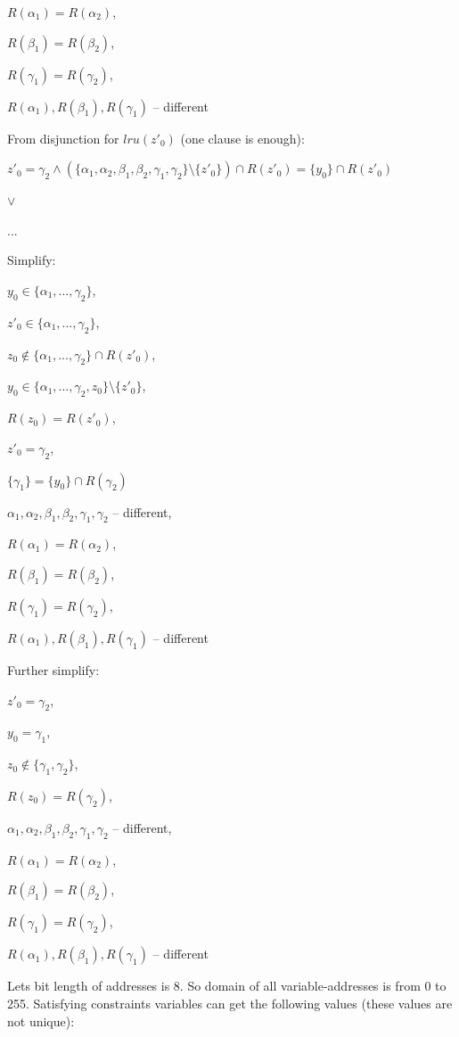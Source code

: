 $R(\alpha_1) = R(\alpha_2)$,

$R(\beta_1) = R(\beta_2)$,

$R(\gamma_1) = R(\gamma_2)$,

$R(\alpha_1), R(\beta_1), R(\gamma_1)$ -- different

From disjunction for $lru(z'_0)$ (one clause is enough):

$z'_0 = \gamma_2 \wedge (\{ \alpha_1, \alpha_2, \beta_1, \beta_2,
\gamma_1, \gamma_2 \}\setminus \{z'_0\}) \cap R(z'_0) = \{y_0\} \cap
R(z'_0)$

$\vee$

...

Simplify:

$y_0 \in \{ \alpha_1, ..., \gamma_2 \}$,

$z'_0 \in \{ \alpha_1, ..., \gamma_2 \}$,

$z_0 \notin \{ \alpha_1, ..., \gamma_2 \} \cap R(z'_0)$,

$y_0 \in \{ \alpha_1, ..., \gamma_2, z_0 \} \setminus \{z'_0 \}$,

$R(z_0) = R(z'_0)$,

$z'_0 = \gamma_2$,

$\{ \gamma_1 \} = \{ y_0 \} \cap R(\gamma_2)$

$\alpha_1, \alpha_2, \beta_1, \beta_2, \gamma_1, \gamma_2$ --
different,

$R(\alpha_1) = R(\alpha_2)$,

$R(\beta_1) = R(\beta_2)$,

$R(\gamma_1) = R(\gamma_2)$,

$R(\alpha_1), R(\beta_1), R(\gamma_1)$ -- different

Further simplify:

$z'_0 = \gamma_2$,

$y_0 = \gamma_1$,

$z_0 \notin \{ \gamma_1, \gamma_2 \}$,

$R(z_0) = R(\gamma_2)$,

$\alpha_1, \alpha_2, \beta_1, \beta_2, \gamma_1, \gamma_2$ --
different,

$R(\alpha_1) = R(\alpha_2)$,

$R(\beta_1) = R(\beta_2)$,

$R(\gamma_1) = R(\gamma_2)$,

$R(\alpha_1), R(\beta_1), R(\gamma_1)$ -- different

Lets bit length of addresses is 8. So domain of all
variable-addresses is from 0 to 255. Satisfying constraints
variables can get the following values (these values are not
unique):

